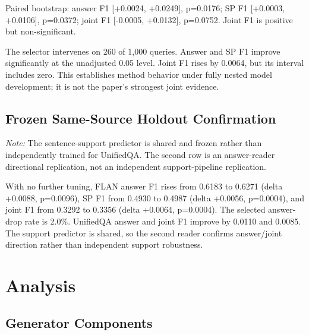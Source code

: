 Paired bootstrap: answer F1 [+0.0024, +0.0249], p=0.0176; SP F1 [+0.0003, +0.0106], p=0.0372; joint F1 [-0.0005, +0.0132], p=0.0752. Joint F1 is positive but non-significant.

The selector intervenes on 260 of 1,000 queries. Answer and SP F1 improve significantly at the unadjusted 0.05 level. Joint F1 rises by 0.0064, but its interval includes zero. This establishes method behavior under fully nested model development; it is not the paper's strongest joint evidence.

\subsection{Frozen Same-Source Holdout Confirmation}

\begin{table}[t]
\centering
\small
\caption{Frozen 3,000-query same-source holdout}
\label{tab:2}
\end{table}

\noindent\textit{Note:} The sentence-support predictor is shared and frozen rather than independently trained for UnifiedQA. The second row is an answer-reader directional replication, not an independent support-pipeline replication.

With no further tuning, FLAN answer F1 rises from 0.6183 to 0.6271 (delta +0.0088, p=0.0096), SP F1 from 0.4930 to 0.4987 (delta +0.0056, p=0.0004), and joint F1 from 0.3292 to 0.3356 (delta +0.0064, p=0.0004). The selected answer-drop rate is 2.0\%. UnifiedQA answer and joint F1 improve by 0.0110 and 0.0085. The support predictor is shared, so the second reader confirms answer/joint direction rather than independent support robustness.

\section{Analysis}

\subsection{Generator Components}

